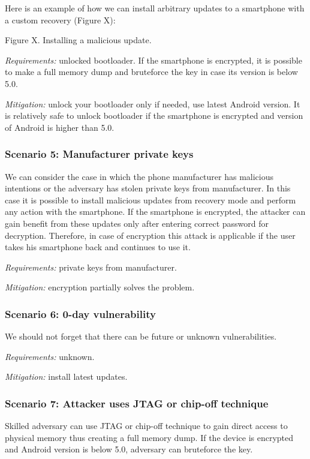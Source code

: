 Here is an example of how we can install arbitrary updates to a smartphone with a custom recovery (Figure X):

Figure X. Installing a malicious update.

\textsl{Requirements:} unlocked bootloader. If the smartphone is encrypted, it is possible to make a full memory dump and bruteforce the key in case its version is below 5.0.

\textsl{Mitigation:} unlock your bootloader only if needed, use latest Android version. It is relatively safe to unlock bootloader if the smartphone is encrypted and version of Android is higher than 5.0.


\subsubsection{Scenario 5: Manufacturer private keys}

We can consider the case in which the phone manufacturer has malicious intentions or the adversary has stolen private keys from manufacturer. In this case it is possible to install malicious updates from recovery mode and perform any action with the smartphone. If the smartphone is encrypted, the attacker can gain benefit from these updates only after entering correct password for decryption. Therefore, in case of encryption this attack is applicable if the user takes his smartphone back and continues to use it.



\textsl{Requirements:} private keys from manufacturer.

\textsl{Mitigation:} encryption partially solves the problem.


\subsubsection{Scenario 6: 0-day vulnerability}

We should not forget that there can be future or unknown vulnerabilities.


\textsl{Requirements:} unknown.

\textsl{Mitigation:} install latest updates.

\subsubsection{Scenario 7: Attacker uses JTAG or chip-off technique}

Skilled adversary can use JTAG or chip-off technique to gain direct access to physical memory thus creating a full memory dump. If the device is encrypted and Android version is below 5.0, adversary can bruteforce the key.


